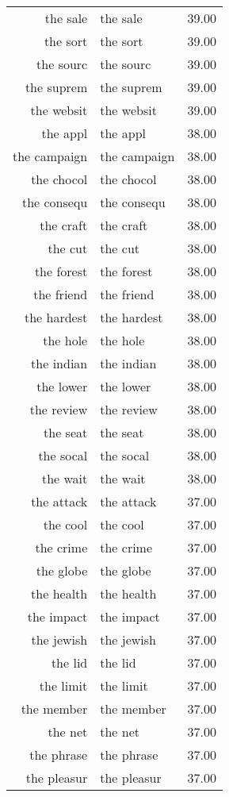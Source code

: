 \begin{table}[ht]
\begin{tabular}{rlr}
  the sale & the sale & 39.00 \\ 
  the sort & the sort & 39.00 \\ 
  the sourc & the sourc & 39.00 \\ 
  the suprem & the suprem & 39.00 \\ 
  the websit & the websit & 39.00 \\ 
  the appl & the appl & 38.00 \\ 
  the campaign & the campaign & 38.00 \\ 
  the chocol & the chocol & 38.00 \\ 
  the consequ & the consequ & 38.00 \\ 
  the craft & the craft & 38.00 \\ 
  the cut & the cut & 38.00 \\ 
  the forest & the forest & 38.00 \\ 
  the friend & the friend & 38.00 \\ 
  the hardest & the hardest & 38.00 \\ 
  the hole & the hole & 38.00 \\ 
  the indian & the indian & 38.00 \\ 
  the lower & the lower & 38.00 \\ 
  the review & the review & 38.00 \\ 
  the seat & the seat & 38.00 \\ 
  the socal & the socal & 38.00 \\ 
  the wait & the wait & 38.00 \\ 
  the attack & the attack & 37.00 \\ 
  the cool & the cool & 37.00 \\ 
  the crime & the crime & 37.00 \\ 
  the globe & the globe & 37.00 \\ 
  the health & the health & 37.00 \\ 
  the impact & the impact & 37.00 \\ 
  the jewish & the jewish & 37.00 \\ 
  the lid & the lid & 37.00 \\ 
  the limit & the limit & 37.00 \\ 
  the member & the member & 37.00 \\ 
  the net & the net & 37.00 \\ 
  the phrase & the phrase & 37.00 \\ 
  the pleasur & the pleasur & 37.00 \\ 

\end{tabular}
\end{table}
